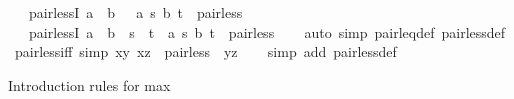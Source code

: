 \begin{isabellebody}
\ \ \ pair{\isacharunderscore}{\kern0pt}lessI{}{\isacharcolon}{\kern0pt}\ {\isachardoublequoteopen}a\ {\isacharless}{\kern0pt}\ b\ \ {\isasymLongrightarrow}\ {\isacharparenleft}{\kern0pt}{\isacharparenleft}{\kern0pt}a{\isacharcomma}{\kern0pt}\ s{\isacharparenright}{\kern0pt}{\isacharcomma}{\kern0pt}\ {\isacharparenleft}{\kern0pt}b{\isacharcomma}{\kern0pt}\ t{\isacharparenright}{\kern0pt}{\isacharparenright}{\kern0pt}\ {\isasymin}\ pair{\isacharunderscore}{\kern0pt}less{\isachardoublequoteclose}\isanewline
\ \ \ pair{\isacharunderscore}{\kern0pt}lessI{}{\isacharcolon}{\kern0pt}\ {\isachardoublequoteopen}a\ {\isasymle}\ b\ {\isasymLongrightarrow}\ s\ {\isacharless}{\kern0pt}\ t\ {\isasymLongrightarrow}\ {\isacharparenleft}{\kern0pt}{\isacharparenleft}{\kern0pt}a{\isacharcomma}{\kern0pt}\ s{\isacharparenright}{\kern0pt}{\isacharcomma}{\kern0pt}\ {\isacharparenleft}{\kern0pt}b{\isacharcomma}{\kern0pt}\ t{\isacharparenright}{\kern0pt}{\isacharparenright}{\kern0pt}\ {\isasymin}\ pair{\isacharunderscore}{\kern0pt}less{\isachardoublequoteclose}\isanewline
%
\isadelimproof
\ \ %
\endisadelimproof
%
\isatagproof
{}\isamarkupfalse%
\ {\isacharparenleft}{\kern0pt}auto\ simp{\isacharcolon}{\kern0pt}\ pair{\isacharunderscore}{\kern0pt}leq{\isacharunderscore}{\kern0pt}def\ pair{\isacharunderscore}{\kern0pt}less{\isacharunderscore}{\kern0pt}def{\isacharparenright}{\kern0pt}%
\endisatagproof
{\isafoldproof}%
%
\isadelimproof
\isanewline
%
\endisadelimproof
\isanewline
{}\isamarkupfalse%
\ pair{\isacharunderscore}{\kern0pt}less{\isacharunderscore}{\kern0pt}iff{}\ {\isacharbrackleft}{\kern0pt}simp{\isacharbrackright}{\kern0pt}{\isacharcolon}{\kern0pt}\ {\isachardoublequoteopen}{\isacharparenleft}{\kern0pt}{\isacharparenleft}{\kern0pt}x{\isacharcomma}{\kern0pt}y{\isacharparenright}{\kern0pt}{\isacharcomma}{\kern0pt}\ {\isacharparenleft}{\kern0pt}x{\isacharcomma}{\kern0pt}z{\isacharparenright}{\kern0pt}{\isacharparenright}{\kern0pt}\ {\isasymin}\ pair{\isacharunderscore}{\kern0pt}less\ {\isasymlongleftrightarrow}\ y{\isacharless}{\kern0pt}z{\isachardoublequoteclose}\isanewline
%
\isadelimproof
\ \ %
\endisadelimproof
%
\isatagproof
{}\isamarkupfalse%
\ {\isacharparenleft}{\kern0pt}simp\ add{\isacharcolon}{\kern0pt}\ pair{\isacharunderscore}{\kern0pt}less{\isacharunderscore}{\kern0pt}def{\isacharparenright}{\kern0pt}%
\endisatagproof
{\isafoldproof}%
%
\isadelimproof
%
\endisadelimproof
%
\begin{isamarkuptext}%
Introduction rules for max%

\end{isamarkuptext}
\end{isabellebody}
